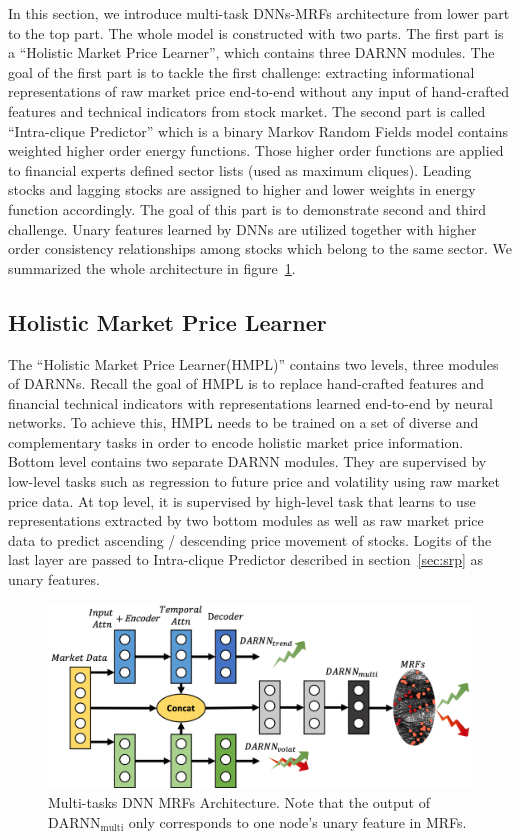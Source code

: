 \documentclass[sigconf]{acmart}
\renewcommand{\cite}{\citep}
\begin{document}
In this section, we introduce multi-task DNNs-MRFs architecture
from lower part to the top part. The whole model is constructed
with two parts. The first part is a ``Holistic Market Price
Learner'', which contains three DARNN modules. The goal of the
first part is to tackle the first challenge: extracting
informational representations of raw market price end-to-end
without any input of hand-crafted features and technical
indicators from stock market. The second part is called
``Intra-clique Predictor'' which is a binary Markov Random Fields
model contains weighted higher order energy functions. Those
higher order functions are applied to financial experts defined
sector lists (used as maximum cliques). Leading stocks and
lagging stocks are assigned to higher and lower weights in energy
function accordingly. The goal of this part is to demonstrate
second and third challenge. Unary features learned by DNNs are
utilized together with higher order consistency relationships
among stocks which belong to the same sector. We summarized the
whole architecture in figure~\ref{fig:mrfrnn}.


\subsection{Holistic Market Price Learner}
\label{sec:hmpl}

The ``Holistic Market Price Learner(HMPL)'' contains two levels,
three modules of DARNNs\cite{qin2017dual}. Recall the goal of
HMPL is to replace hand-crafted features and financial technical
indicators with representations learned end-to-end by neural
networks. To achieve this, HMPL needs to be trained on a set of
diverse and complementary tasks in order to encode holistic
market price information. Bottom level contains two separate
DARNN modules. They are supervised by low-level tasks such as
regression to future price and volatility using raw market price
data. At top level, it is supervised by high-level task that
learns to use representations extracted by two bottom modules as
well as raw market price data to predict ascending / descending
price movement of stocks. Logits of the last layer are passed to
Intra-clique Predictor described in section~\ref{sec:srp} as
unary features.

\begin{figure}[t]
  \centering
  \includegraphics[width=1\columnwidth]{Methodology/figures/hmplmrf.png}
  \caption{\label{fig:mrfrnn} Multi-tasks DNN MRFs Architecture. Note 
  that the output of $\text{DARNN}_{\text{multi}}$ only corresponds to one 
  node's unary feature in MRFs.}
\end{figure}
\end{document}

